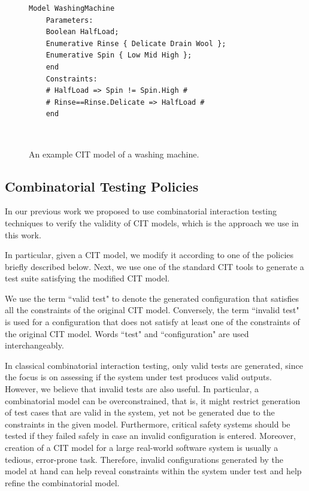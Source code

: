 \begin{tikzborder}{\cite{Gargantini16:validation}}
\begin{tikzborder}{\cite{gargantini_combinatorial_2017}}

\begin{figure}[h]
	\centering 
	\begin{lstlisting}[language=comb]
	Model WashingMachine
	Parameters:
	Boolean HalfLoad;
	Enumerative Rinse { Delicate Drain Wool };
	Enumerative Spin { Low Mid High };
	end
	Constraints:
	# HalfLoad => Spin != Spin.High #
	# Rinse==Rinse.Delicate => HalfLoad #
	end\end{lstlisting}
	\protect\caption{An example CIT model of a washing machine.}\
	\label{fig:washerexample} 
\end{figure}


\subsection{Combinatorial Testing Policies}
\label{sec:citpolicies}

\begin{tikzborder}{\cite{gargantini_combinatorial_2017}}
In our previous work \cite{Gargantini16:validation} we proposed to use combinatorial interaction testing techniques to verify the validity of CIT models, which is the approach we use in this work. 

In particular, given a CIT model, we modify it according to one of the policies briefly described below. 
Next, we use one of the standard CIT tools to generate a test suite satisfying the modified CIT model. %

We use the term ``valid test" to denote the generated configuration that satisfies all the constraints of the original CIT model. Conversely, the term ``invalid test" is used for a configuration that does not satisfy at least one of the constraints of the original CIT model. Words ``test" and ``configuration" are used interchangeably.

In classical combinatorial interaction testing, only valid tests are generated, since the focus is on assessing if the system under test produces valid outputs. 
However, we believe that invalid tests are also useful.  In particular, a combinatorial model can be overconstrained, that is, it might restrict generation of test cases that are valid in the system, yet not be generated due to the constraints in the given model. Furthermore, critical safety systems should be tested if they failed safely in case an invalid configuration is entered. Moreover, creation of a CIT model for a large real-world software system is usually a tedious, error-prone task. Therefore, invalid configurations generated by the model at hand can help reveal constraints within the system under test and help refine the combinatorial model.


\end{tikzborder}
\end{tikzborder}
\end{tikzborder}
